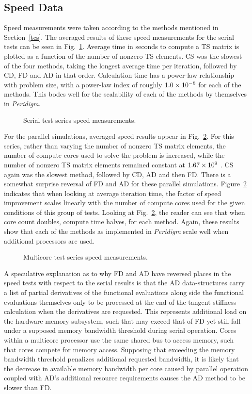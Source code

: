 \documentclass[preprint,12pt]{elsarticle}
\begin{document}
\subsection{Speed Data}
Speed measurements were taken according to the methods mentioned in Section~\ref{tcs}. The averaged results of these speed measurements for the serial tests can be seen in Fig.~\ref{fig:serial_speed}.  Average time in seconds to compute a TS matrix is plotted as a function of the number of nonzero TS elements.  CS was the slowest of the four methods, taking the longest average time per iteration,  followed by CD, FD and AD in that order. Calculation time has a power-law relationship with problem size, with a power-law index of roughly $\num{1.0E-6}$ for each of the methods. This bodes well for the scalability of each of the methods by themselves in \emph{Peridigm}.
%
\begin{figure}[tbp]
  \centering
  \scalebox{1.0}{}
  \caption{Serial test series speed measurements.}
  \label{fig:serial_speed}
\end{figure}
%
For the parallel simulations, averaged speed results appear in Fig.~\ref{fig:multi_speed}. For this series, rather than varying the number of nonzero TS matrix elements, the number of compute cores used to solve the problem is increased, while the number of nonzero TS matrix elements remained constant at $\num{1.67E9}$ .  CS again was the slowest method, followed by CD, AD and then FD.  There is a somewhat surprise reversal of FD and AD for these parallel simulations.  Figure~\ref{fig:multi_speed} indicates that when looking at average iteration time, the factor of speed improvement scales linearly with the number of compute cores used for the given conditions of this group of tests. Looking at Fig.~\ref{fig:multi_speed}, the reader can see that when core count doubles, compute time halves, for each method. Again, these results show that each of the methods as implemented in \emph{Peridigm} scale well when additional processors are used. 
%
\begin{figure}[tbp]
  \centering
  \scalebox{1.0}{}
  \caption{Multicore test series speed measurements.}
  \label{fig:multi_speed}
\end{figure}
%
A speculative explanation as to why FD and AD have reversed places in the speed tests with respect to the serial results is that the AD data-structures carry a list of partial derivatives of the functional evaluations along side the functional evaluations themselves only to be processed at the end of the tangent-stiffness calculation when the derivatives are requested. This represents additional load on the hardware memory subsystem, such that may exceed that of FD yet still fall under a supposed memory bandwidth threshold during serial operation. Cores within a multicore processor use the same shared bus to access memory, such that cores compete for memory access. Supposing that exceeding the memory bandwidth threshold penalizes additional requested bandwidth, it is likely that the decrease in available memory bandwidth per core caused by parallel operation coupled with AD's additional resource requirements causes the AD method to be slower than FD. 
\end{document}
